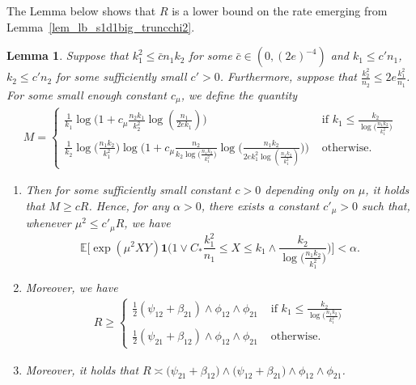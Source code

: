 \documentclass{article}
\newcommand{\EE}{\mathbb{E}}
\newcommand{\one}{\mathbf{1}}
\newcommand{\Ct}{C_{*}}
\newtheorem{lemma}{Lemma}
\begin{document}
The Lemma below shows that $R$ is a lower bound on the rate emerging from Lemma~\ref{lem_lb_s1d1big_truncchi2}.
\begin{lemma}\label{lem_simplify_s1d1big_truncchi2}
    Suppose that $k_1^2 \leq \bar{c}n_1k_2$ for some $\bar{c} \in (0,(2e)^{-4})$ and $k_1 \leq c'n_1$, $k_2 \leq c' n_2$ for some sufficiently small $c'>0$. Furthermore, suppose that $\frac{k^2_2}{n_2} \leq 2e\frac{k_1^2}{n_1}$. 
    For some small enough constant $c_\mu$, we define the quantity 
    \begin{align*}
        M = \begin{cases}
            \frac{1}{k_1} \log\Big(1 + c_\mu \frac{n_2k_1}{k_2^2}\log(\frac{n_1}{2ek_1})\Big) & \text{ if } k_1 \leq \frac{k_2}{\log\big(\frac{n_1k_2}{k_1^2}\big)}\\
            \frac{1}{k_2}\log\big(\frac{n_1k_2}{k_1^2}\big)\log\Big(1 + c_\mu \frac{n_2}{k_2\log\big(\frac{n_1k_2}{k_1^2}\big)}\log\big(\frac{n_1k_2}{2ek_1^2\log(\frac{n_1k_2}{k_1^2})}\big)\Big) & \text{ otherwise.}
        \end{cases}
    \end{align*}
    \begin{enumerate}
        \item 
    Then for some sufficiently small constant $c>0$ depending only on $\mu$, it holds that $M \geq cR$. 
    Hence, for any $\alpha>0$, there exists a constant $c'_\mu>0$ such that, whenever $\mu^2 \leq c'_\mu R$, we have
    \[\EE\Big[\exp(\mu^2XY)\one\Big( 1 \vee \Ct \frac{k_1^2}{n_1} \leq X \leq k_1\wedge\frac{k_2}{\log\big(\frac{n_1k_2}{k_1^2}\big)}\Big)\Big] < \alpha.\]
    \item Moreover, we have
    \begin{align}
        R \geq \begin{cases}
            \frac{1}{2}(\psi_{12} + \beta_{21}) \land \phi_{12} \land \phi_{21} & \text{ if } k_1 \leq \frac{k_2}{\log\big(\frac{n_1k_2}{k_1^2}\big)}\\
            \frac{1}{2}(\psi_{21} + \beta_{12}) \land \phi_{12} \land \phi_{21} & \text{ otherwise. }
        \end{cases} \label{eq_lower_bounn_M}
    \end{align}
    \item Moreover, it holds that $R \asymp \big(\psi_{21} + \beta_{12}\big) \land \big(\psi_{12} + \beta_{21}\big) \land \phi_{12} \land \phi_{21}$.
    \end{enumerate}
\end{lemma}
\end{document}
